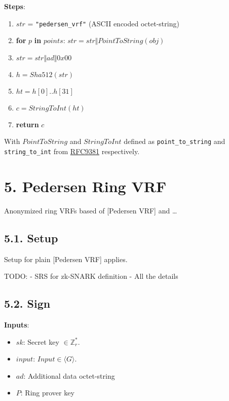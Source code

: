 \documentclass[
]{article}
\providecommand{\tightlist}{%
  \setlength{\itemsep}{0pt}\setlength{\parskip}{0pt}}
\begin{document}
\textbf{Steps}:

\begin{enumerate}
\def\labelenumi{\arabic{enumi}.}
\tightlist
\item
  \(str\) = \texttt{"pedersen\_vrf"} (ASCII encoded octet-string)
\item
  \textbf{for} \(p\) \textbf{in} \(points\):
  \(str = str \Vert PointToString(obj)\)
\item
  \(str = str \Vert ad \Vert 0x00\)
\item
  \(h = Sha512(str)\)
\item
  \(ht = h[0] .. h[31]\)
\item
  \(c = StringToInt(ht)\)
\item
  \textbf{return} \(c\)
\end{enumerate}

With \(PointToString\) and \(StringToInt\) defined as
\texttt{point\_to\_string} and \texttt{string\_to\_int} from
\href{https://datatracker.ietf.org/doc/rfc9381/}{RFC9381} respectively.

\hypertarget{pedersen-ring-vrf}{%
\section{5. Pedersen Ring VRF}\label{pedersen-ring-vrf}}

Anonymized ring VRFs based of {[}Pedersen VRF{]} and \ldots{}

\hypertarget{setup-2}{%
\subsection{5.1. Setup}\label{setup-2}}

Setup for plain {[}Pedersen VRF{]} applies.

TODO: - SRS for zk-SNARK definition - All the details

\hypertarget{sign-2}{%
\subsection{5.2. Sign}\label{sign-2}}

\textbf{Inputs}:

\begin{itemize}
\tightlist
\item
  \(sk\): Secret key \(\in \mathbb{Z}^*_r\).
\item
  \(input\): \(Input \in \langle G \rangle\).
\item
  \(ad\): Additional data octet-string
\item
  \(P\): Ring prover key
\end{itemize}
\end{document}
